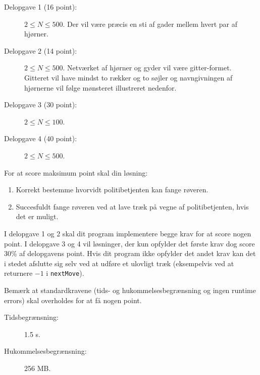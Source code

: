 \documentclass{boi2014-dk}
\begin{document}
    \Scoring
    \begin{description}
        \item[Delopgave 1 (16 point):] $2 \le N \le 500$.
        	  Der vil være præcis en sti af gader
        	  mellem hvert par af hjørner.
        \item[Delopgave 2 (14 point):] $2 \le N \le 500$.
        	  Netværket af hjørner og gyder vil være gitter-formet.
        	  Gitteret vil have mindst to rækker og to søjler og
        	  navngivningen af hjørnerne vil følge mønsteret illustreret
        	  nedenfor.
        \begin{figure}[h!]
           \centering
        \end{figure}
        \item[Delopgave 3 (30 point):] $2 \le N \le 100$.
        \item[Delopgave 4 (40 point):] $2 \le N \le 500$.
    \end{description}

    For at score maksimum point skal din løsning:
    \begin{enumerate}
    	\item Korrekt bestemme hvorvidt politibetjenten kan fange
   			  røveren.
   		\item Succesfuldt fange røveren ved at lave træk på
			  vegne af politibetjenten, hvis det er muligt.
    \end{enumerate}

    I delopgave 1 og 2 skal dit program implementere begge krav for at score
    nogen point. I delopgave 3 og 4 vil løsninger, der kun opfylder det første
	krav dog score 30\% af delopgavens point. Hvis dit program ikke opfylder
    det andet krav kan det i stedet afslutte sig selv ved at udføre et ulovligt
    træk (eksempelvis ved at returnere $-1$ i {\tt nextMove}).

    Bemærk at standardkravene (tids- og hukommelsesbegrænsning og ingen
    runtime errors) skal overholdes for at få nogen point.

    \Constraints

    \begin{description}
        \item[Tidsbegrænsning:] 1.5 s.
        \item[Hukommelsesbegrænsning:] 256 MB.
    \end{description}
\end{document}

